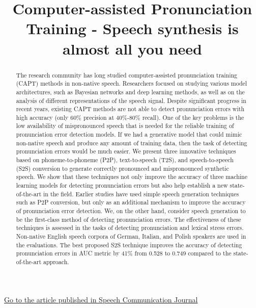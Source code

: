 \documentclass[]{interact}
\theoremstyle{plain}%
\theoremstyle{definition}
\theoremstyle{remark}
\begin{document}

\title{
Computer-assisted Pronunciation Training - Speech synthesis is almost all you need
}

\author{
}



\maketitle

\href{https://www.sciencedirect.com/science/article/pii/S0167639322000863?utm_campaign=STMJ_AUTH_SERV_PUBLISHED&utm_medium=email&utm_acid=78131116&SIS_ID=&dgcid=STMJ_AUTH_SERV_PUBLISHED&CMX_ID=&utm_in=DM270343&utm_source=AC_}{Go to the article published in Speech Communication Journal}

\bigskip

\begin{abstract}
The research community has long studied computer-assisted pronunciation training (CAPT) methods in non-native speech. Researchers focused on studying various model architectures, such as Bayesian networks and deep learning methods, as well as on the analysis of different representations of the speech signal. Despite significant progress in recent years, existing CAPT methods are not able to detect pronunciation errors with high accuracy (only 60\% precision at 40\%-80\% recall). One of the key problems is the low availability of mispronounced speech that is needed for the reliable training of pronunciation error detection models. If we had a generative model that could mimic non-native speech and produce any amount of training data, then the task of detecting pronunciation errors would be much easier. We present three innovative techniques based on phoneme-to-phoneme (P2P), text-to-speech (T2S), and speech-to-speech (S2S) conversion to generate correctly pronounced and mispronounced synthetic speech. We show that these techniques not only improve the accuracy of three machine learning models for detecting pronunciation errors but also help establish a new state-of-the-art in the field. Earlier studies have used simple speech generation techniques such as P2P conversion, but only as an additional mechanism to improve the accuracy of pronunciation error detection. We, on the other hand, consider speech generation to be the first-class method of detecting pronunciation errors. The effectiveness of these techniques is assessed in the tasks of detecting pronunciation and lexical stress errors. Non-native English speech corpora of German, Italian, and Polish speakers are used in the evaluations. The best proposed S2S technique improves the accuracy of detecting pronunciation errors in AUC metric by 41\% from 0.528 to 0.749 compared to the state-of-the-art approach.

\end{abstract}
\end{document}

